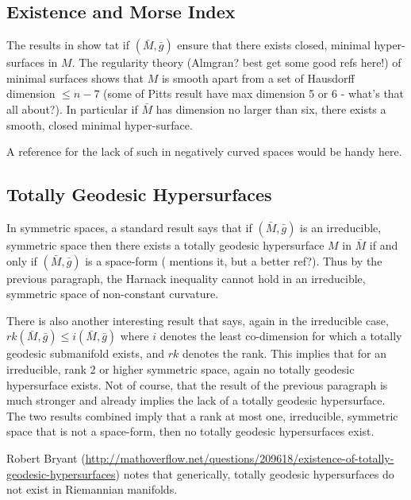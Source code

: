 \documentclass{amsart}
\begin{document}
\subsection{Existence and Morse Index}
\label{subsec:existence_index}

The results in \cite{pitts:/1976,pitts:/1981,pitts:1983,SchoenSimon:1981} show tat if \((\bar{M}, \bar{g})\) ensure that there exists closed, minimal hyper-surfaces in \(M\). The regularity theory (Almgran? best get some good refs here!) of minimal surfaces shows that \(M\) is smooth apart from a set of Hausdorff dimension \(\leq n-7\) (some of Pitts result have max dimension 5 or 6 - what's that all about?). In particular if \(\bar{M}\) has dimension no larger than six, there exists a smooth, closed minimal hyper-surface.

A reference for the lack of such in negatively curved spaces would be handy here.

\subsection{Totally Geodesic Hypersurfaces}
\label{subsec:totally_geodesic}

In symmetric spaces, a standard result says that if \((\bar{M}, \bar{g})\) is an irreducible, symmetric space then there exists a totally geodesic hypersurface \(M\) in \(\bar{M}\) if and only if \((\bar{M}, \bar{g})\) is a space-form (\cite{BenrdtOlmos:2014} mentions it, but a better ref?). Thus by the previous paragraph, the Harnack inequality cannot hold in an irreducible, symmetric space of non-constant curvature.

There is also another interesting result \cite{BenrdtOlmos:2014} that says, again in the irreducible case, \(rk(\bar{M}, \bar{g}) \leq i(\bar{M}, \bar{g})\) where \(i\) denotes the least co-dimension for which a totally geodesic submanifold exists, and \(rk\) denotes the rank. This implies that for an irreducible, rank 2 or higher symmetric space, again no totally geodesic hypersurface exists. Not of course, that the result of the previous paragraph is much stronger and already implies the lack of a totally geodesic hypersurface. The two results combined imply that a rank at most one, irreducible, symmetric space that is not a space-form, then no totally geodesic hypersurfaces exist.

Robert Bryant (\url{http://mathoverflow.net/questions/209618/existence-of-totally-geodesic-hypersurfaces}) notes that generically, totally geodesic hypersurfaces do not exist in Riemannian manifolds.
\end{document}
